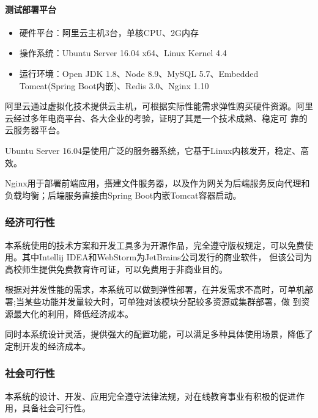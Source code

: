 \documentclass[titlepage,UTF8,linespread=1.5]{ctexart}
\begin{document}
\paragraph{测试部署平台}
\begin{itemize}
    \item 硬件平台：阿里云主机3台，单核CPU、2G内存
    \item 操作系统：Ubuntu Server 16.04 x64、Linux Kernel 4.4
    \item 运行环境：Open JDK 1.8、Node 8.9、MySQL 5.7、Embedded Tomcat(Spring Boot内嵌)、Redis 3.0、Nginx 1.10
\end{itemize}\par
阿里云通过虚拟化技术提供云主机，可根据实际性能需求弹性购买硬件资源。阿里云经过多年电商平台、各大企业的考验，证明了其是一个技术成熟、稳定可
靠的云服务器平台。\par
Ubuntu Server 16.04是使用广泛的服务器系统，它基于Linux内核发开，稳定、高效。\par
Nginx用于部署前端应用，搭建文件服务器，以及作为网关为后端服务反向代理和负载均衡；后端服务直接由Spring Boot内嵌Tomcat容器启动。\par

\subsubsection{经济可行性}
本系统使用的技术方案和开发工具多为开源作品，完全遵守版权规定，可以免费使 用。其中Intellij IDEA和WebStorm为JetBrains公司发行的商业软件，
但该公司为高校师生提供免费教育许可证，可以免费用于非商业目的。\par
根据对并发性能的需求，本系统可以做到弹性部署，在并发需求不高时，可单机部署;当某些功能并发量较大时，可单独对该模块分配较多资源或集群部署，做
到资源最大化的利用，降低经济成本。\par
同时本系统设计灵活，提供强大的配置功能，可以满足多种具体使用场景，降低了定制开发的经济成本。\par
\subsubsection{社会可行性}
本系统的设计、开发、应用完全遵守法律法规，对在线教育事业有积极的促进作用，具备社会可行性。\par

\end{document}
